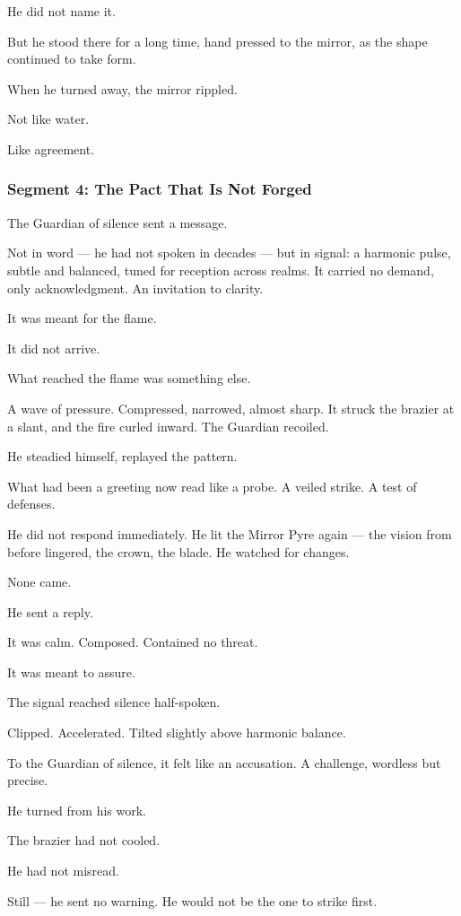\documentclass[9pt]{article}
\begin{document}
He did not name it.

But he stood there for a long time, hand pressed to the mirror, as the shape continued to take form.

When he turned away, the mirror rippled.

Not like water.

Like agreement.

\newpage

\subsubsection*{Segment 4: The Pact That Is Not Forged}

The Guardian of silence sent a message.

Not in word — he had not spoken in decades — but in signal: a harmonic pulse, subtle and balanced, tuned for reception across realms. It carried no demand, only acknowledgment. An invitation to clarity.

It was meant for the flame.

It did not arrive.

What reached the flame was something else.

A wave of pressure. Compressed, narrowed, almost sharp. It struck the brazier at a slant, and the fire curled inward. The Guardian recoiled.

He steadied himself, replayed the pattern.

What had been a greeting now read like a probe. A veiled strike. A test of defenses.

He did not respond immediately. He lit the Mirror Pyre again — the vision from before lingered, the crown, the blade. He watched for changes.

None came.

He sent a reply.

It was calm. Composed. Contained no threat.

It was meant to assure.

The signal reached silence half-spoken.

Clipped. Accelerated. Tilted slightly above harmonic balance.

To the Guardian of silence, it felt like an accusation. A challenge, wordless but precise.

He turned from his work.

The brazier had not cooled.

He had not misread.

Still — he sent no warning. He would not be the one to strike first.
\end{document}

